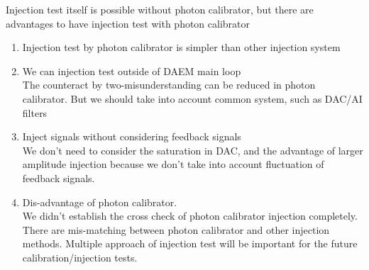 Injection test itself is possible without photon calibrator, 
but there are advantages to have injection test with photon calibrator
\begin{enumerate}
\item Injection test by photon calibrator is simpler than other injection system\\
\item We can injection test outside of DAEM main loop\\
The counteract by two-misunderstanding can be reduced in photon calibrator.
But we should take into account common system, such as DAC/AI filters\\
\item Inject signals without considering feedback signals\\
We don't need to consider the saturation in DAC, and the advantage of larger amplitude injection 
because we don't take into account fluctuation of feedback signals.\\
\item Dis-advantage of photon calibrator.\\
We didn't establish the cross check of photon calibrator injection completely. 
There are mis-matching between photon calibrator and other injection methods.
Multiple approach of injection test will be important for the future calibration/injection tests. 
\end{enumerate}


